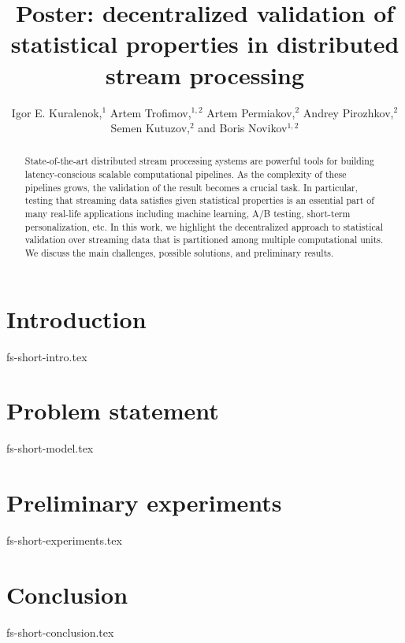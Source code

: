 \documentclass[sigconf]{acmart}
\theoremstyle{remark}
\begin{document}

\title {Poster: decentralized validation of statistical properties in distributed stream processing}

\author{  Igor E. Kuralenok,$^1$     Artem Trofimov,$^ {1,2}$    Artem Permiakov,$^ {2}$   Andrey Pirozhkov,$^ {2}$    Semen Kutuzov,$^ {2}$  and  Boris Novikov$^ {1,2}$ }

\begin{abstract}
State-of-the-art distributed stream processing systems are powerful tools for building latency-conscious scalable computational pipelines. As the complexity of these pipelines grows, the validation of the result becomes a crucial task. In particular, testing that streaming data satisfies given statistical properties is an essential part of many real-life applications including machine learning, A/B testing, short-term personalization, etc. In this work, we highlight the decentralized approach to statistical validation over streaming data that is partitioned among multiple computational units. We discuss the main challenges, possible solutions, and preliminary results.
\end{abstract}


\maketitle

\thispagestyle{empty}

\section {Introduction}
 {fs-short-intro.tex}


\section {Problem statement}
 {fs-short-model.tex}

\section {Preliminary experiments}
 {fs-short-experiments.tex}


\section {Conclusion}
 {fs-short-conclusion.tex}



\end{document}
